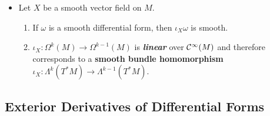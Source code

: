 \documentclass[11pt]{article}
\begin{document}
\begin{itemize}
\item \begin{proposition}
Let $X$ be a smooth vector field on $M$.
\begin{enumerate}
\item If $\omega$ is a smooth differential form, then $\iota_X\omega$ is smooth.
\item $\iota_X: \Omega^k(M)  \rightarrow \Omega^{k-1}(M)$ is \emph{\textbf{linear}} over ${\mathcal C}^{\infty}(M)$ and therefore corresponds to a \textbf{smooth bundle homomorphism} $\iota_X: \Lambda^k(T^{*}M) \rightarrow \Lambda^{k-1}(T^{*}M)$.
\end{enumerate}
\end{proposition}
\end{itemize}

\subsection{Exterior Derivatives of Differential Forms}
\end{document}
